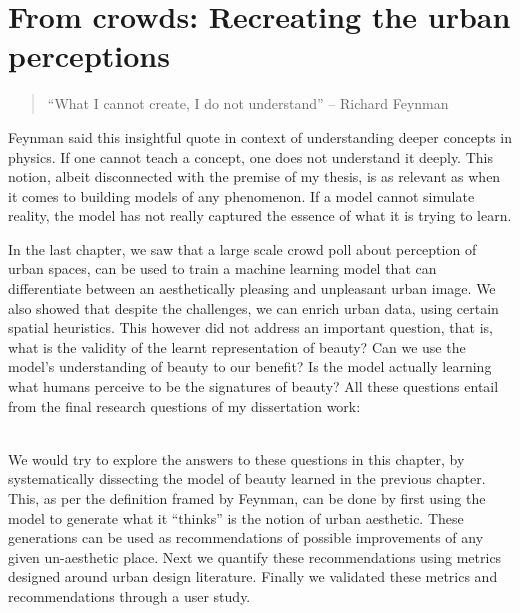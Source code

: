 \chapter{From crowds: Recreating the urban perceptions}
\graphicspath{{Chapter4/plots/} {Chapter5/plots/examples/} {Chapter5/plots/GAN_examples/}}

\label{chap:generation}
\begin{quote}
    ``What I cannot create, I do not understand'' -- Richard Feynman
\end{quote}
Feynman said this insightful quote in context of understanding deeper concepts in physics. If one cannot teach a concept, one does not understand it deeply. 
This notion, albeit disconnected with the premise of my thesis, is as relevant as when it comes to building models of any phenomenon. If a model cannot simulate reality, the model has not really captured the essence of what it is trying to learn. 

In the last chapter, we saw that a large scale crowd poll about perception of urban spaces, can be used to train a machine learning model that can differentiate between an aesthetically pleasing and unpleasant urban image. We also showed that despite the challenges, we can enrich urban data, using certain spatial heuristics. This however did not address an important question, that is, what is the validity of the learnt representation of beauty? Can we use the model's understanding of beauty to our benefit? Is the model actually learning what humans perceive to be the signatures of beauty?
All these questions entail from the final research questions of my dissertation work: 

\noindent{}
\\

We would try to explore the answers to these questions in this chapter, by systematically dissecting the model of beauty learned in the previous chapter. This, as per the definition framed by Feynman, can be done by first using the model to generate what it ``thinks'' is the notion of urban aesthetic. These generations can be used as recommendations of possible improvements of any given un-aesthetic place. Next we quantify these recommendations using metrics designed around urban design literature. Finally we validated these metrics and recommendations through a user study.  


